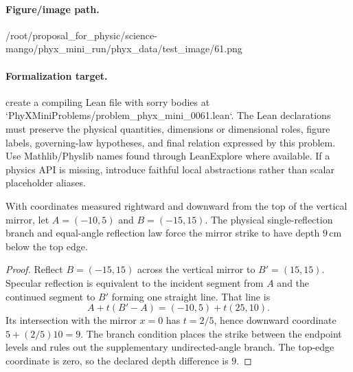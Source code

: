 \paragraph{Figure/image path.}
/root/proposal\_for\_physic/science-mango/phyx\_mini\_run/phyx\_data/test\_image/61.png

\paragraph{Formalization target.}
create a compiling Lean file with sorry bodies at `PhyXMiniProblems/problem\_phyx\_mini\_0061.lean`. The Lean declarations must preserve the physical quantities, dimensions or dimensional roles, figure labels, governing-law hypotheses, and final relation expressed by this problem.
Use Mathlib/Physlib names found through LeanExplore where available. If a physics API is missing, introduce faithful local abstractions rather than scalar placeholder aliases.

\begin{theorem}
\label{thm:physics:phyx_mini_0061:target}
With coordinates measured rightward and downward from the top of the vertical
mirror, let \(A=(-10,5)\) and \(B=(-15,15)\).  The physical single-reflection
branch and equal-angle reflection law force the mirror strike to have depth
\(9\,\mathrm{cm}\) below the top edge.
\end{theorem}
\begin{proof}
Reflect \(B=(-15,15)\) across the vertical mirror to \(B'=(15,15)\).
Specular reflection is equivalent to the incident segment from \(A\) and the
continued segment to \(B'\) forming one straight line.  That line is
\[
 A+t(B'-A)=(-10,5)+t(25,10).
\]
Its intersection with the mirror \(x=0\) has \(t=2/5\), hence downward
coordinate \(5+(2/5)10=9\).  The branch condition places the strike between
the endpoint levels and rules out the supplementary undirected-angle branch.
The top-edge coordinate is zero, so the declared depth difference is \(9\).
\end{proof}


